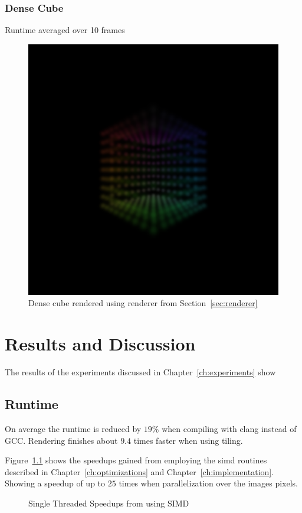 \documentclass[a4paper, 11pt]{memoir}
\begin{document}
    \subsection{Dense Cube}
    Runtime averaged over 10 frames
    \begin{figure}[t]
        \centering
        \includegraphics[scale=.2]{images/cube.png}
        \caption{Dense cube rendered using renderer from Section~\ref{sec:renderer}}
        \label{fig:cube_render}
    \end{figure}
    
    \chapter{Results and Discussion}

    The results of the experiments discussed in Chapter~\ref{ch:experiments} show

    \section{Runtime}

    On average the runtime is reduced by $19\%$ when compiling with clang instead of GCC.
    Rendering finishes about $9.4$ times faster when using tiling.

    Figure~\ref{fig:runtimes_st_simd_speedup} shows
    the speedups gained from employing the \gls{simd} routines described in Chapter~\ref{ch:optimizations}
    and Chapter~\ref{ch:implementation}. Showing a speedup of up to $25$ times when
    parallelization over the images pixels.
    \begin{figure}[t]
        \centering
        
        \caption{Single Threaded Speedups from using SIMD}
        \label{fig:runtimes_st_simd_speedup}
    \end{figure}
\end{document}
